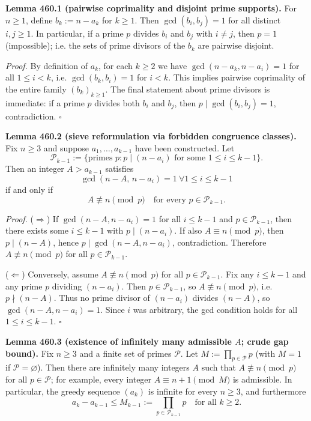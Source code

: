 \medskip
\noindent\textbf{Lemma 460.1 (pairwise coprimality and disjoint prime supports).}
For $n\ge 1$, define $b_k:=n-a_k$ for $k\ge 1$.  Then $\gcd(b_i,b_j)=1$ for all distinct $i,j\ge 1$. In particular, if a prime $p$ divides $b_i$ and $b_j$ with $i\neq j$, then $p=1$ (impossible); i.e. the sets of prime divisors of the $b_k$ are pairwise disjoint.

\textit{Proof.}
By definition of $a_k$, for each $k\ge 2$ we have $\gcd(n-a_k,n-a_i)=1$ for all $1\le i<k$, i.e. $\gcd(b_k,b_i)=1$ for $i<k$. This implies pairwise coprimality of the entire family $(b_k)_{k\ge 1}$. The final statement about prime divisors is immediate: if a prime $p$ divides both $b_i$ and $b_j$, then $p\mid \gcd(b_i,b_j)=1$, contradiction. \hfill$\square$

\medskip
\noindent\textbf{Lemma 460.2 (sieve reformulation via forbidden congruence classes).}
Fix $n\ge 3$ and suppose $a_1,\dots,a_{k-1}$ have been constructed. Let
\[\mathcal P_{k-1}:=\{\text{primes }p: p\mid (n-a_i)\text{ for some }1\le i\le k-1\}.
\]
Then an integer $A>a_{k-1}$ satisfies
\[\gcd(n-A,\,n-a_i)=1\ \forall 1\le i\le k-1\]
if and only if
\[A\not\equiv n\pmod p\quad\text{for every }p\in\mathcal P_{k-1}.
\]

\textit{Proof.}
($\Rightarrow$) If $\gcd(n-A,n-a_i)=1$ for all $i\le k-1$ and $p\in\mathcal P_{k-1}$, then there exists some $i\le k-1$ with $p\mid (n-a_i)$. If also $A\equiv n\pmod p$, then $p\mid (n-A)$, hence $p\mid\gcd(n-A,n-a_i)$, contradiction. Therefore $A\not\equiv n\pmod p$ for all $p\in\mathcal P_{k-1}$.

($\Leftarrow$) Conversely, assume $A\not\equiv n\pmod p$ for all $p\in\mathcal P_{k-1}$. Fix any $i\le k-1$ and any prime $p$ dividing $(n-a_i)$. Then $p\in\mathcal P_{k-1}$, so $A\not\equiv n\pmod p$, i.e. $p\nmid(n-A)$. Thus no prime divisor of $(n-a_i)$ divides $(n-A)$, so $\gcd(n-A,n-a_i)=1$. Since $i$ was arbitrary, the gcd condition holds for all $1\le i\le k-1$. \hfill$\square$

\medskip
\noindent\textbf{Lemma 460.3 (existence of infinitely many admissible $A$; crude gap bound).}
Fix $n\ge 3$ and a finite set of primes $\mathcal P$. Let $M:=\prod_{p\in\mathcal P} p$ (with $M=1$ if $\mathcal P=\varnothing$). Then there are infinitely many integers $A$ such that $A\not\equiv n\pmod p$ for all $p\in\mathcal P$; for example, every integer $A\equiv n+1\pmod M$ is admissible. In particular, the greedy sequence $(a_k)$ is infinite for every $n\ge 3$, and furthermore
\[a_k-a_{k-1}\le M_{k-1}:=\prod_{p\in\mathcal P_{k-1}} p\quad\text{for all }k\ge 2.
\]

